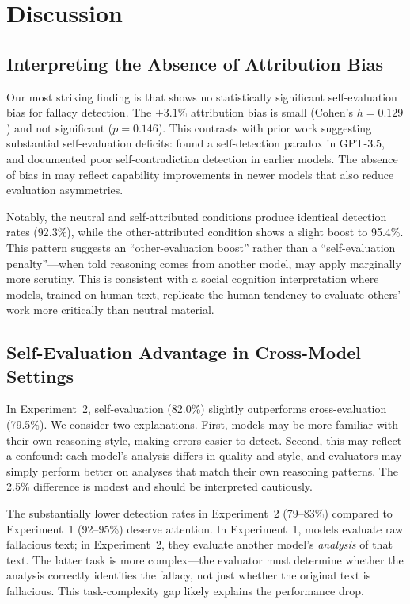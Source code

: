 \section{Discussion}
\label{sec:discussion}

\subsection{Interpreting the Absence of Attribution Bias}

Our most striking finding is that \gptfull shows no statistically significant self-evaluation bias for fallacy detection. The $+3.1\%$ attribution bias is small (Cohen's $h = 0.129$) and not significant ($p = 0.146$). This contrasts with prior work suggesting substantial self-evaluation deficits: \citet{payandeh2023susceptible} found a self-detection paradox in GPT-3.5, and \citet{liu2024self} documented poor self-contradiction detection in earlier models. The absence of bias in \gptfull may reflect capability improvements in newer models that also reduce evaluation asymmetries.

Notably, the neutral and self-attributed conditions produce identical detection rates (92.3\%), while the other-attributed condition shows a slight boost to 95.4\%. This pattern suggests an ``other-evaluation boost'' rather than a ``self-evaluation penalty''---when told reasoning comes from another model, \gptfull may apply marginally more scrutiny. This is consistent with a social cognition interpretation where models, trained on human text, replicate the human tendency to evaluate others' work more critically than neutral material.

\subsection{Self-Evaluation Advantage in Cross-Model Settings}

In Experiment~2, self-evaluation (82.0\%) slightly outperforms cross-evaluation (79.5\%). We consider two explanations. First, models may be more familiar with their own reasoning style, making errors easier to detect. Second, this may reflect a confound: each model's analysis differs in quality and style, and evaluators may simply perform better on analyses that match their own reasoning patterns. The 2.5\% difference is modest and should be interpreted cautiously.

The substantially lower detection rates in Experiment~2 (79--83\%) compared to Experiment~1 (92--95\%) deserve attention. In Experiment~1, models evaluate raw fallacious text; in Experiment~2, they evaluate another model's \emph{analysis} of that text. The latter task is more complex---the evaluator must determine whether the analysis correctly identifies the fallacy, not just whether the original text is fallacious. This task-complexity gap likely explains the performance drop.

